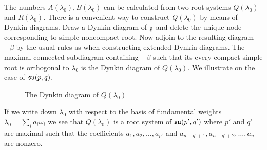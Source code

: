 \documentclass[12pt,a4paper,final]{report}
\begin{document}
The numbers $A(\lambda_0), B(\lambda_0)$ can be calculated from two root systems $Q(\lambda_0)$ and $R(\lambda_0)$. There is a convenient way to construct $Q(\lambda_0)$ by means of Dynkin diagrams. Draw a Dynkin diagram of $\mathfrak{g}$ and delete the unique node corresponding to simple noncompact root. Now adjoin to the resulting diagram $-\beta$ by the usual rules as when constructing extended Dynkin diagrams. The maximal connected subdiagram containing $-\beta$ such that its every compact simple root is orthogonal to $\lambda_0$ is the Dynkin diagram of $Q(\lambda_0)$. We illustrate on the case of $\mathfrak{su}(p,q)$. 
\begin{figure}[H]\label{fig:Q}
  \begin{center}
  \end{center}\caption{The Dynkin diagram of $Q(\lambda_0)$} 
\end{figure}
If we write down $\lambda_0$ with respect to the basis of fundamental weights $\lambda_0 = \sum_i a_i \omega_i$ we see that $Q(\lambda_0)$ is a root system of $\mathfrak{su}(p',q')$ where $p'$ and $q'$ are maximal such that the coefficients $a_1,a_2,\ldots,a_{p'}$ and $a_{n-q'+1},a_{n-q'+2}, \ldots, a_n$ are nonzero.


% 
%
%
\end{document}
